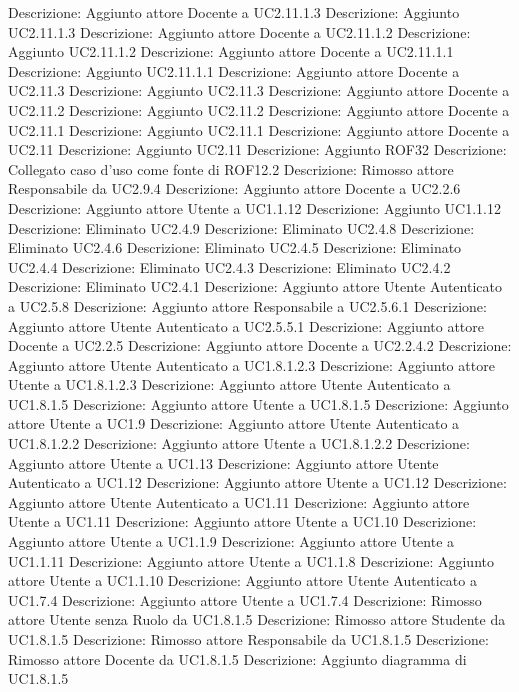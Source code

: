 Descrizione: Aggiunto attore Docente a UC2.11.1.3 
Descrizione: Aggiunto UC2.11.1.3 
Descrizione: Aggiunto attore Docente a UC2.11.1.2 
Descrizione: Aggiunto UC2.11.1.2 
Descrizione: Aggiunto attore Docente a UC2.11.1.1 
Descrizione: Aggiunto UC2.11.1.1 
Descrizione: Aggiunto attore Docente a UC2.11.3 
Descrizione: Aggiunto UC2.11.3 
Descrizione: Aggiunto attore Docente a UC2.11.2 
Descrizione: Aggiunto UC2.11.2 
Descrizione: Aggiunto attore Docente a UC2.11.1 
Descrizione: Aggiunto UC2.11.1 
Descrizione: Aggiunto attore Docente a UC2.11 
Descrizione: Aggiunto UC2.11 
Descrizione: Aggiunto ROF32 
Descrizione: Collegato caso d'uso  come fonte di ROF12.2 
Descrizione: Rimosso attore Responsabile da UC2.9.4 
Descrizione: Aggiunto attore Docente a UC2.2.6 
Descrizione: Aggiunto attore Utente a UC1.1.12 
Descrizione: Aggiunto UC1.1.12 
Descrizione: Eliminato UC2.4.9 
Descrizione: Eliminato UC2.4.8 
Descrizione: Eliminato UC2.4.6 
Descrizione: Eliminato UC2.4.5 
Descrizione: Eliminato UC2.4.4 
Descrizione: Eliminato UC2.4.3 
Descrizione: Eliminato UC2.4.2 
Descrizione: Eliminato UC2.4.1 
Descrizione: Aggiunto attore Utente Autenticato a UC2.5.8 
Descrizione: Aggiunto attore Responsabile a UC2.5.6.1 
Descrizione: Aggiunto attore Utente Autenticato a UC2.5.5.1 
Descrizione: Aggiunto attore Docente a UC2.2.5 
Descrizione: Aggiunto attore Docente a UC2.2.4.2 
Descrizione: Aggiunto attore Utente Autenticato a UC1.8.1.2.3 
Descrizione: Aggiunto attore Utente a UC1.8.1.2.3 
Descrizione: Aggiunto attore Utente Autenticato a UC1.8.1.5 
Descrizione: Aggiunto attore Utente a UC1.8.1.5 
Descrizione: Aggiunto attore Utente a UC1.9 
Descrizione: Aggiunto attore Utente Autenticato a UC1.8.1.2.2 
Descrizione: Aggiunto attore Utente a UC1.8.1.2.2 
Descrizione: Aggiunto attore Utente a UC1.13 
Descrizione: Aggiunto attore Utente Autenticato a UC1.12 
Descrizione: Aggiunto attore Utente a UC1.12 
Descrizione: Aggiunto attore Utente Autenticato a UC1.11 
Descrizione: Aggiunto attore Utente a UC1.11 
Descrizione: Aggiunto attore Utente a UC1.10 
Descrizione: Aggiunto attore Utente a UC1.1.9 
Descrizione: Aggiunto attore Utente a UC1.1.11 
Descrizione: Aggiunto attore Utente a UC1.1.8 
Descrizione: Aggiunto attore Utente a UC1.1.10 
Descrizione: Aggiunto attore Utente Autenticato a UC1.7.4 
Descrizione: Aggiunto attore Utente a UC1.7.4 
Descrizione: Rimosso attore Utente senza Ruolo da UC1.8.1.5 
Descrizione: Rimosso attore Studente da UC1.8.1.5 
Descrizione: Rimosso attore Responsabile da UC1.8.1.5 
Descrizione: Rimosso attore Docente da UC1.8.1.5 
Descrizione: Aggiunto diagramma di UC1.8.1.5 
